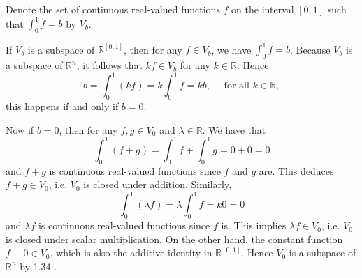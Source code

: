 \begin{solution}
Denote the set of continuous real-valued functions $f$ on the interval $[0,1]$ such that $\int_0^1 f=b$ by $V_b$.

If $V_b$ is a subspace of $\mathbb{R}^{[0,1]}$, then for any $f \in V_b$, we have $\int_0^1 f=b$. Because $V_b$ is a subspace of $\mathbb{R}^n$, it follows that $k f \in V_b$ for any $k \in \mathbb{R}$. Hence
$$
b=\int_0^1(k f)=k \int_0^1 f=k b, \quad \text { for all } k \in \mathbb{R},
$$
this happens if and only if $b=0$.

Now if $b=0$, then for any $f, g \in V_0$ and $\lambda \in \mathbb{R}$. We have that
$$
\int_0^1(f+g)=\int_0^1 f+\int_0^1 g=0+0=0
$$
and $f+g$ is continuous real-valued functions since $f$ and $g$ are. This deduces $f+g \in V_0$, i.e. $V_0$ is closed under addition. Similarly,
$$
\int_0^1(\lambda f)=\lambda \int_0^1 f=k 0=0
$$
and $\lambda f$ is continuous real-valued functions since $f$ is. This implies $\lambda f \in V_0$, i.e. $V_0$ is closed under scalar multiplication. On the other hand, the constant function $f \equiv 0 \in V_0$, which is also the additive identity in $\mathbb{R}^{[0,1]}$. Hence $V_0$ is a subspace of $\mathbb{R}^n$ by 1.34 .
\end{solution}

